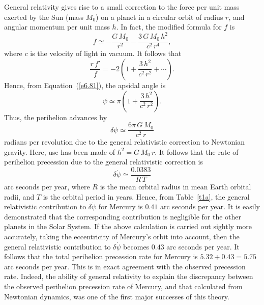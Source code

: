 General relativity gives rise to a small correction to the force per unit mass
exerted by the Sun (mass $M_0$) on a planet in a circular orbit of radius $r$, and angular momentum
per unit mass $h$. In fact, the modified formula for $f$ is
\begin{equation}
f \simeq -\frac{G\,M_0}{r^2}-\frac{3\,G\,M_0\,h^2}{c^2\,r^4},
\end{equation}
where $c$ is the velocity of light in vacuum. It follows that
\begin{equation}
\frac{r\,f'}{f} = - 2\left(1+ \frac{3\,h^2}{c^2\,r^2}+ \cdots\right).
\end{equation}
Hence, from Equation~(\ref{e6.81}), the apsidal angle is
\begin{equation}
\psi \simeq \pi\left(1+ \frac{3\,h^2}{c^2\,r^2}\right).
\end{equation}
Thus, the perihelion advances by
\begin{equation}
\delta\psi \simeq \frac{6\pi\,G\,M_0}{c^2 \,r}
\end{equation}
radians per revolution due to the general relativistic correction to Newtonian gravity. Here,
use has been made of $h^2=G\,M_0\,r$.  It follows that the
rate of perihelion precession due to the general relativistic correction is
\begin{equation}
\delta\dot{\psi} \simeq \frac{0.0383}{R\,T}
\end{equation}
arc seconds per year, where $R$ is the mean orbital radius in mean Earth orbital radii,
and $T$ is the orbital period in years. Hence, from Table~\ref{t1a}, the general relativistic contribution to
$\delta\dot{\psi}$ for Mercury is
$0.41$ arc seconds per year. It is easily demonstrated that the corresponding contribution is negligible for
the other planets in the Solar System. If the above calculation is carried out sightly more accurately,
taking the eccentricity of Mercury's orbit into account, then the general relativistic contribution
to $\delta\dot{\psi}$ becomes
$0.43$ arc seconds per year. It follows that the total perihelion precession rate for Mercury
is $5.32+0.43= 5.75$ arc seconds per year. This is in exact agreement with the observed precession
rate. Indeed, the ability of general relativity to explain  the discrepancy between the observed perihelion precession
rate of Mercury, and that calculated from Newtonian dynamics, was one of the first major successes of
this theory.

